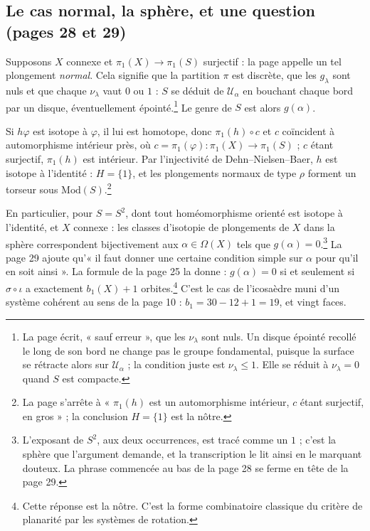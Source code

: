 \documentclass[11pt,a4paper]{article}
\begin{document}
\subsection*{Le cas normal, la sphère, et une question (pages 28 et 29)}

Supposons $X$ connexe et $\pi_1(X) \to \pi_1(S)$ surjectif : la page appelle
un tel plongement \emph{normal}. Cela signifie que la partition $\pi$ est
discrète, que les $g_\lambda$ sont nuls et que chaque $\nu_\lambda$ vaut $0$
ou $1$ : $S$ se déduit de $\mathcal{U}_\alpha$ en bouchant chaque bord par un
disque, éventuellement épointé.\footnote{La page écrit, « sauf erreur »,
que les $\nu_\lambda$ sont nuls. Un disque épointé recollé le long de son
bord ne change pas le groupe fondamental, puisque la surface se rétracte
alors sur $\mathcal{U}_\alpha$ ; la condition juste est
$\nu_\lambda \leqslant 1$. Elle se réduit à $\nu_\lambda = 0$ quand $S$ est
compacte.} Le genre de $S$ est alors $g(\alpha)$.

Si $h\varphi$ est isotope à $\varphi$, il lui est homotope, donc
$\pi_1(h) \circ c$ et $c$ coïncident à automorphisme intérieur près, où
$c = \pi_1(\varphi) : \pi_1(X) \to \pi_1(S)$ ; $c$ étant surjectif,
$\pi_1(h)$ est intérieur. Par l'injectivité de Dehn--Nielsen--Baer, $h$ est
isotope à l'identité : $H = \{1\}$, et les plongements normaux de type $\rho$
forment un torseur sous $\mathrm{Mod}(S)$.\footnote{La page s'arrête à
« $\pi_1(h)$ est un automorphisme intérieur, $c$ étant surjectif, en gros » ;
la conclusion $H = \{1\}$ est la nôtre.}

En particulier, pour $S = S^{2}$, dont tout homéomorphisme orienté est
isotope à l'identité, et $X$ connexe : les classes d'isotopie de plongements
de $X$ dans la sphère correspondent bijectivement aux $\alpha \in \Omega(X)$
tels que $g(\alpha) = 0$.\footnote{L'exposant de $S^{2}$, aux deux
occurrences, est tracé comme un $1$ ; c'est la sphère que l'argument
demande, et la transcription le lit ainsi en le marquant douteux. La
phrase commencée au bas de la page 28 se ferme en tête de la page 29.} La
page 29 ajoute qu'« il faut donner une certaine condition simple sur
$\alpha$ pour qu'il en soit ainsi ». La formule de la page 25 la donne :
$g(\alpha) = 0$ si et seulement si $\sigma \circ \iota$ a exactement
$b_1(X) + 1$ orbites.\footnote{Cette réponse est la nôtre. C'est la forme
combinatoire classique du critère de planarité par les systèmes de
rotation.} C'est le cas de l'icosaèdre muni d'un système cohérent au sens
de la page 10 : $b_1 = 30 - 12 + 1 = 19$, et vingt faces.
\end{document}
